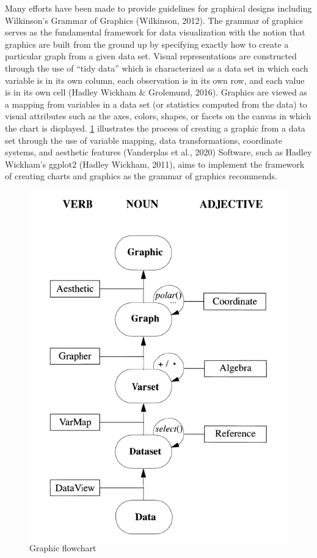 \documentclass[print]{nuthesis}
\begin{document}
Many efforts have been made to provide guidelines for graphical designs including Wilkinson's Grammar of Graphics (Wilkinson, 2012).
The grammar of graphics serves as the fundamental framework for data visualization with the notion that graphics are built from the ground up by specifying exactly how to create a particular graph from a given data set.
Visual representations are constructed through the use of ``tidy data'' which is characterized as a data set in which each variable is in its own column, each observation is in its own row, and each value is in its own cell (Hadley Wickham \& Grolemund, 2016).
Graphics are viewed as a mapping from variables in a data set (or statistics computed from the data) to visual attributes such as the axes, colors, shapes, or facets on the canvas in which the chart is displayed.
\cref{fig:graphic-flowchart} illustrates the process of creating a graphic from a data set through the use of variable mapping, data transformations, coordinate systems, and aesthetic features (Vanderplas et al., 2020)
Software, such as Hadley Wickham's ggplot2 (Hadley Wickham, 2011), aims to implement the framework of creating charts and graphics as the grammar of graphics recommends.

\begin{figure}[tbp]

{\centering \includegraphics[width=0.5\linewidth,]{images/graphic-flowchart} 

}

\caption{Graphic flowchart}\label{fig:graphic-flowchart}
\end{figure}
\end{document}
